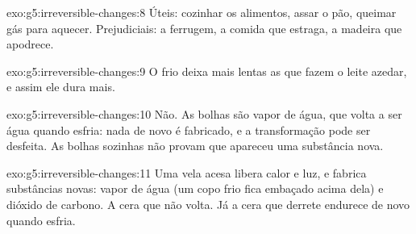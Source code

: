 \begin{solution}{exo:g5:irreversible-changes:8}
Úteis: cozinhar os alimentos, assar o pão, queimar gás para aquecer.
Prejudiciais: a ferrugem, a comida que estraga, a madeira que apodrece.
\end{solution}

\begin{solution}{exo:g5:irreversible-changes:9}
O frio deixa mais lentas as  que fazem o leite
azedar, e assim ele dura mais.
\end{solution}

\begin{solution}{exo:g5:irreversible-changes:10}
Não. As bolhas são vapor de água, que volta a ser água quando esfria:
nada de novo é fabricado, e a transformação pode ser desfeita. As bolhas
sozinhas não provam que apareceu uma substância nova.
\end{solution}

\begin{solution}{exo:g5:irreversible-changes:11}
Uma vela acesa libera calor e luz, e fabrica substâncias novas: vapor de
água (um copo frio fica embaçado acima dela) e dióxido de carbono. A
cera que  não volta. Já a cera que derrete endurece de novo quando
esfria.
\end{solution}
